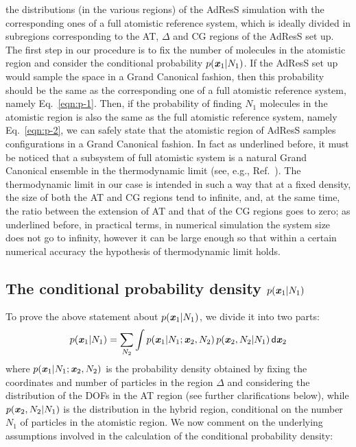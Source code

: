 \documentclass[aip,jcp,a4paper,reprint,onecolumn]{revtex4-1}
\newcommand{\vect}[1]{\textbf{\textit{#1}}}
\newcommand{\dd}[1]{\textsf{#1}}
\newcommand{\HY}{{\Delta}}
\begin{document}
the distributions (in the various regions) of the AdResS simulation
with the corresponding ones of a full atomistic reference system, which is ideally divided
in subregions corresponding to the AT, $\HY$ and CG regions of the AdResS
set up. The first step in our procedure is to fix the number of molecules in the atomistic
region and consider the conditional probability $p(\vect x_1 |
N_1)$. If the AdResS set up would sample the space in a Grand Canonical fashion, then this
probability should be the same as the corresponding one of a full
atomistic reference system, namely Eq.~\eqref{eqn:p-1}.  Then, if the
probability of finding $N_1$ molecules in the atomistic region is also
the same as the full atomistic reference system, namely
Eq.~\eqref{eqn:p-2}, we can safely state that the atomistic region of AdResS
samples configurations in a Grand Canonical fashion. In fact as underlined before, it must be noticed that a subsystem of full atomistic system is a natural Grand Canonical ensemble in the thermodynamic limit (see, e.g., Ref.~). 
The thermodynamic limit in our case is intended in such a way that at a fixed density, the size of
  both the AT and CG regions tend to infinite, and, at the same time,
  the ratio between the extension of AT and that of the CG regions goes to zero; as underlined before, in practical terms, in numerical simulation the system size does not go to infinity, however it can be large enough so that within a certain numerical accuracy the hypothesis of thermodynamic limit holds.


\subsection{The conditional probability density $p(\vect x_1 | N_1)$}  \label{sec:p-1}

%
To prove the above statement about $p(\vect x_1 | N_1)$, we divide it into two parts:
\begin{align}\label{eqn:divide-cond-p}
  p(\vect x_1 | N_1) = \sum_{N_2}\int
  p(\vect x_1 | N_1; \vect x_2, N_2) \,
  p(\vect x_2, N_2 | N_1)
  \,\dd d\vect x_2
\end{align}
where $p(\vect x_1 | N_1; \vect x_2, N_2)$ is the probability density obtained by fixing the
coordinates and number of particles in the region $\HY$ and considering
the distribution of the DOFs in the AT region (see further clarifications below), while $p(\vect x_2, N_2 | N_1)$ is the distribution in the hybrid region, conditional on the number $N_{1}$ of particles in the atomistic region. We now comment on the underlying assumptions involved in the calculation of the conditional probability density: 
\end{document}
